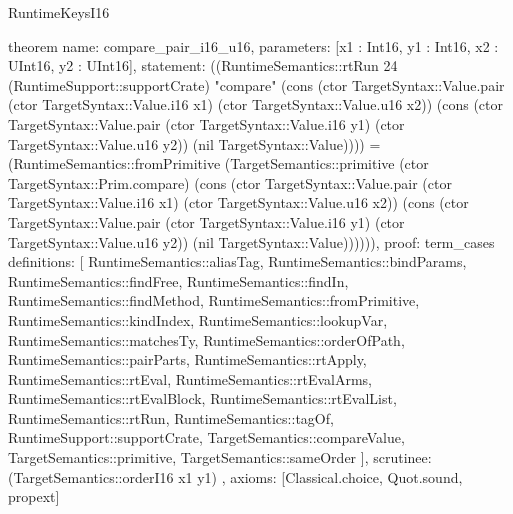 \begin{lexlean}{RuntimeKeysI16}
\begin{semanticmodule}
theorem{
  name: compare_pair_i16_u16,
  parameters: [x1 : Int16, y1 : Int16, x2 : UInt16, y2 : UInt16],
  statement: ((RuntimeSemantics::rtRun 24 (RuntimeSupport::supportCrate) "compare" (cons (ctor TargetSyntax::Value.pair (ctor TargetSyntax::Value.i16 x1) (ctor TargetSyntax::Value.u16 x2)) (cons (ctor TargetSyntax::Value.pair (ctor TargetSyntax::Value.i16 y1) (ctor TargetSyntax::Value.u16 y2)) (nil TargetSyntax::Value)))) = (RuntimeSemantics::fromPrimitive (TargetSemantics::primitive (ctor TargetSyntax::Prim.compare) (cons (ctor TargetSyntax::Value.pair (ctor TargetSyntax::Value.i16 x1) (ctor TargetSyntax::Value.u16 x2)) (cons (ctor TargetSyntax::Value.pair (ctor TargetSyntax::Value.i16 y1) (ctor TargetSyntax::Value.u16 y2)) (nil TargetSyntax::Value)))))),
  proof: term_cases{
    definitions: [
      RuntimeSemantics::aliasTag,
      RuntimeSemantics::bindParams,
      RuntimeSemantics::findFree,
      RuntimeSemantics::findIn,
      RuntimeSemantics::findMethod,
      RuntimeSemantics::fromPrimitive,
      RuntimeSemantics::kindIndex,
      RuntimeSemantics::lookupVar,
      RuntimeSemantics::matchesTy,
      RuntimeSemantics::orderOfPath,
      RuntimeSemantics::pairParts,
      RuntimeSemantics::rtApply,
      RuntimeSemantics::rtEval,
      RuntimeSemantics::rtEvalArms,
      RuntimeSemantics::rtEvalBlock,
      RuntimeSemantics::rtEvalList,
      RuntimeSemantics::rtRun,
      RuntimeSemantics::tagOf,
      RuntimeSupport::supportCrate,
      TargetSemantics::compareValue,
      TargetSemantics::primitive,
      TargetSemantics::sameOrder
    ],
    scrutinee: (TargetSemantics::orderI16 x1 y1)
  },
  axioms: [Classical.choice, Quot.sound, propext]
}


\end{semanticmodule}
\end{lexlean}
